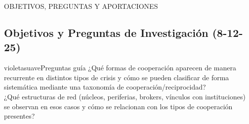 \documentclass[a4paper,11pt]{article}
\begin{document}
    

    


\newpage 
\vspace*{\fill}
\begin{center}
    {\fontsize{1.5cm}{16pt}\selectfont OBJETIVOS, PREGUNTAS Y APORTACIONES}
\end{center}
\vspace*{\fill}
\newpage

\begin{seccionbox}[verdesuave]
    {\section*{Objetivos y Preguntas de Investigación (8-12-25)} }

\begin{enumerate}

    \begin{caja}{violetasuave}{Preguntas guía}{}
        ¿Qué formas de cooperación aparecen de manera recurrente en distintos tipos de crisis y cómo se pueden clasificar de forma sistemática mediante una taxonomía de cooperación/reciprocidad?\\[0.2cm]
        ¿Qué estructuras de red (núcleos, periferias, brokers, vínculos con instituciones) se observan en esos casos y cómo se relacionan con los tipos de cooperación presentes?
    \end{caja}


\end{enumerate}
\end{seccionbox}
\end{document}

